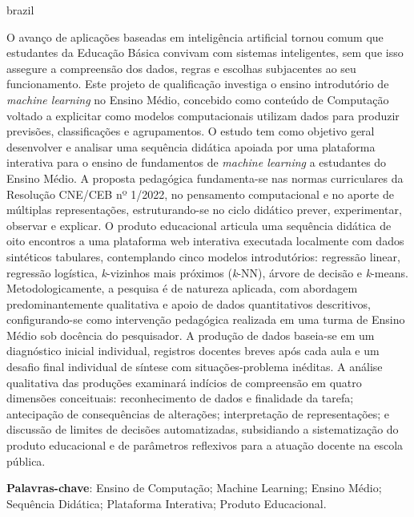 \setlength{\absparsep}{18pt} 

\begin{resumo}[Resumo]
 \begin{otherlanguage*}{brazil}
   
   \vspace{\onelineskip}
   \noindent 
   
O avanço de aplicações baseadas em inteligência artificial tornou comum que estudantes da Educação Básica convivam com sistemas inteligentes, sem que isso assegure a compreensão dos dados, regras e escolhas subjacentes ao seu funcionamento. Este projeto de qualificação investiga o ensino introdutório de \textit{machine learning} no Ensino Médio, concebido como conteúdo de Computação voltado a explicitar como modelos computacionais utilizam dados para produzir previsões, classificações e agrupamentos. O estudo tem como objetivo geral desenvolver e analisar uma sequência didática apoiada por uma plataforma interativa para o ensino de fundamentos de \textit{machine learning} a estudantes do Ensino Médio. A proposta pedagógica fundamenta-se nas normas curriculares da Resolução CNE/CEB nº 1/2022, no pensamento computacional e no aporte de múltiplas representações, estruturando-se no ciclo didático prever, experimentar, observar e explicar. O produto educacional articula uma sequência didática de oito encontros a uma plataforma web interativa executada localmente com dados sintéticos tabulares, contemplando cinco modelos introdutórios: regressão linear, regressão logística, \textit{k}-vizinhos mais próximos (\textit{k}-NN), árvore de decisão e \textit{k}-means. Metodologicamente, a pesquisa é de natureza aplicada, com abordagem predominantemente qualitativa e apoio de dados quantitativos descritivos, configurando-se como intervenção pedagógica realizada em uma turma de Ensino Médio sob docência do pesquisador. A produção de dados baseia-se em um diagnóstico inicial individual, registros docentes breves após cada aula e um desafio final individual de síntese com situações-problema inéditas. A análise qualitativa das produções examinará indícios de compreensão em quatro dimensões conceituais: reconhecimento de dados e finalidade da tarefa; antecipação de consequências de alterações; interpretação de representações; e discussão de limites de decisões automatizadas, subsidiando a sistematização do produto educacional e de parâmetros reflexivos para a atuação docente na escola pública.
   
   \textbf{Palavras-chave}: Ensino de Computação; Machine Learning; Ensino Médio; Sequência Didática; Plataforma Interativa; Produto Educacional.

 \end{otherlanguage*}
\end{resumo}

